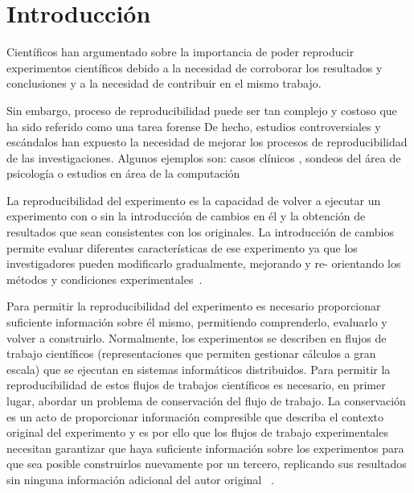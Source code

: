 \chapter{Introducción}
\label{Chapter1} 
\newcommand{\keyword}[1]{\textbf{#1}}
\newcommand{\tabhead}[1]{\textbf{#1}}
\newcommand{\code}[1]{\texttt{#1}}
\newcommand{\file}[1]{\texttt{\bfseries#1}}
\newcommand{\option}[1]{\texttt{\itshape#1}}

Científicos han argumentado sobre la importancia de poder reproducir experimentos científicos debido a la necesidad de corroborar los resultados y conclusiones y a la necesidad de contribuir en el mismo trabajo. 

Sin embargo, proceso de reproducibilidad puede ser tan complejo y costoso que ha sido referido como una tarea forense \cite{baggerly2009deriving}
De hecho, estudios controversiales y escándalos han expuesto la necesidad de mejorar los procesos de reproducibilidad de las investigaciones. Algunos ejemplos son: casos clínicos \cite{ioannidis2009repeatability}, sondeos del área de psicología \cite{open2015estimating} o estudios en área de la computación \cite{baggerly2009deriving}

La reproducibilidad del experimento es la capacidad de volver a ejecutar un experimento con o sin la introducción de cambios en él y la obtención de resultados que sean consistentes con los originales.
La introducción de cambios permite evaluar diferentes características de ese experimento ya que los investigadores pueden modificarlo gradualmente, mejorando y re- orientando los métodos y condiciones experimentales~\cite{stodden2010reproducible}.

Para permitir la reproducibilidad del experimento es necesario proporcionar suficiente información sobre él mismo, permitiendo comprenderlo, evaluarlo y volver a construirlo. Normalmente, los experimentos se describen en flujos de trabajo científicos (representaciones que permiten gestionar cálculos a gran escala) que se ejecutan en sistemas informáticos distribuidos. 
Para permitir la reproducibilidad de estos flujos de trabajos científicos es necesario, en primer lugar, abordar un problema de conservación del flujo de trabajo. 
La conservación es un acto de proporcionar información compresible que describa el contexto original del experimento  y es por ello que los flujos de trabajo experimentales necesitan garantizar que haya suficiente información sobre los experimentos para que sea posible construirlos nuevamente por un tercero, replicando sus resultados sin ninguna información adicional del autor original ~\cite{garijo2013quantifying}. 

